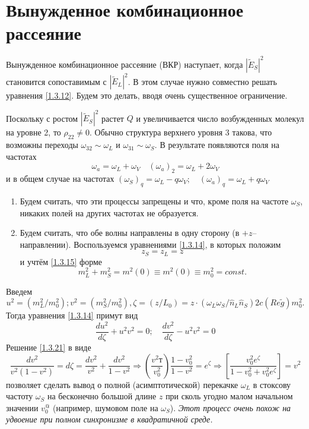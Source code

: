 \documentclass[a4paper]{article}
\begin{document}
\section{Вынужденное комбинационное рассеяние}

Вынужденное комбинационное рассеяние (ВКР) наступает, когда $\left|\tilde{E}_{S}\right|^{2}$ становится сопоставимым с $\left|\tilde{E}_{L}\right|^{2}$. В этом случае нужно совместно решать уравнения \eqref{1.3.12}. Будем это делать, вводя очень существенное ограничение.

Поскольку с ростом $\left|\tilde{E}_{S}\right|^{2}$ растет $Q$ и увеличивается число возбужденных молекул на уровне 2, то $\rho_{22}\neq0$. Обычно структура верхнего уровня 3 такова, что возможны переходы  $\omega_{32}\sim\omega_{L}$ и $\omega_{31}\sim\omega_{S}$. В результате появляются поля на частотах  $$\omega_{a}=\omega_{L}+\omega_{V}\quad(\omega_{a})_{2}=\omega_{L}+2\omega_{V}$$ и в общем случае на частотах $(\omega_{S})_{q}=\omega_{L}-q\omega_{V};\quad(\omega_{a})_{q}=\omega_{L}+q\omega_{V}$
\begin{enumerate}
	\item Будем считать, что эти процессы запрещены и что, кроме поля на частоте $\omega_{S}$, никаких полей на других частотах не образуется. 
	\item Будем  считать, что обе волны направлены в одну сторону (в $+z$--направлении). Воспользуемся уравнениями \eqref{1.3.14}, в которых положим 
	\begin{equation}
		z_{S}=z_{L}=z\label{1.3.19}
	\end{equation}
и учтём \eqref{1.3.15}  форме
\begin{equation}
	m_{L}^{2}+m_{S}^{2}=m^{2}(0)\equiv m^{2}(0)\equiv m_{0}^{2}=const.
	\tag{15''}
	\label{1.3.15''}
\end{equation}
\end{enumerate}
Введем
\begin{equation}
	u^{2}=(m_{L}^{2}/m_{0}^{2});v^{2}=(m_{S}^{2}/m_{0}^{2}),\zeta=(z/L_{0})=z\cdot(\omega_{L}\omega_{S}/\hat{n}_{L}\hat{n}_{S})2c(Re\tilde{g})m_{0}^{2}.
	\label{1.3.20}
\end{equation}
Тогда уравнения \eqref{1.3.14} примут вид
\begin{equation}
	\frac{du^{2}}{d\zeta}+u^{2}v^{2}=0;\quad\frac{dv^{2}}{d\zeta}-u^{2}v^{2}=0\label{1.3.21}
\end{equation}
Решение \eqref{1.3.21} в виде
\begin{equation}
	\frac{dv^{2}}{v^{2}(1-v^{2})}=d\zeta=\frac{dv^{2}}{v^{2}}+\frac{dv^{2}}{1-v^{2}}\Rightarrow\left(\frac{v^{2}т}{v_{0}^{2}}\right)\frac{1-v_{0}^{2}}{1-v^{2}}=e^{\zeta}\Rightarrow\left[\frac{v_{0}^{2}e^{\zeta}}{1-v_{0}^{2}+v_{0}^{2}e^{\zeta}}\right]=v^{2}\label{1.3.22}
\end{equation}
позволяет сделать вывод о полной (асимптотической) перекачке $\omega_{L}$ в стоксову частоту $\omega_{S}$ на бесконечно большой длине $z$ при сколь угодно малом начальном значении $v^{@}_{0}$  (например, шумовом поле на $\omega_{S}$). \textit{Этот процесс очень похож на удвоение при полном синхронизме в квадратичной среде. }
\end{document}
